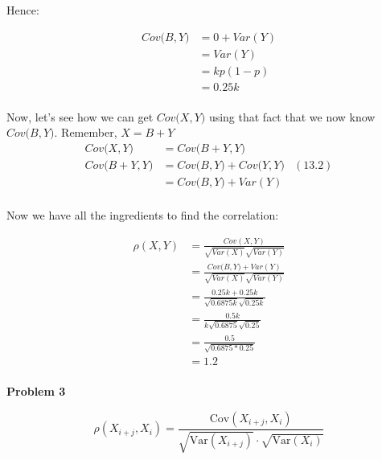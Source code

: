 \documentclass[12pt]{article}
\begin{document}
Hence:

\begin{equation*}
	\begin{aligned}
	Cov\big(B,Y\big) &= 0 + Var(Y)\\
	&= Var(Y)\\
	&= kp(1-p)\\
	&= 0.25k\\
	\end{aligned}
\end{equation*}

Now, let's see how we can get $Cov\big(X,Y\big)$ using that fact that we now know $Cov\big(B,Y\big)$. Remember, $X=B+Y$
\begin{equation*}
	\begin{aligned}
	Cov\big(X,Y\big) &= Cov\big(B+Y,Y\big)\\
	Cov\big(B+Y,Y\big) &= Cov\big(B,Y\big) + Cov\big(Y,Y\big)&(\textrm{13.2})\\
	&= Cov\big(B,Y\big) + Var(Y)\\
	\end{aligned}
\end{equation*}

Now we have all the ingredients to find the correlation:


\begin{equation*}
	\begin{aligned}
	\rho(X,Y) &= \frac{Cov(X, Y)}{\sqrt{Var(X)}\sqrt{Var(Y)}} \\
	       &= \frac{Cov\big(B,Y\big) + Var(Y)}{\sqrt{Var(X)}\sqrt{Var(Y)}} \\
	       &= \frac{0.25k + 0.25k}{\sqrt{0.6875k}\sqrt{0.25k}} \\
	       &= \frac{0.5k}{k\sqrt{0.6875}\sqrt{0.25}} \\
	       &= \frac{0.5}{\sqrt{0.6875*0.25}} \\
	       &= 1.2\\
	\end{aligned}
\end{equation*}


\pagebreak
\textbf{Problem 3} 

$$\rho(X_{i+j}, X_i) = \frac{\text{Cov}(X_{i+j}, X_i)}
                 {\sqrt{\text{Var}(X_{i+j})} \cdot \sqrt{\text{Var}(X_i)}} $$ 
\end{document}
